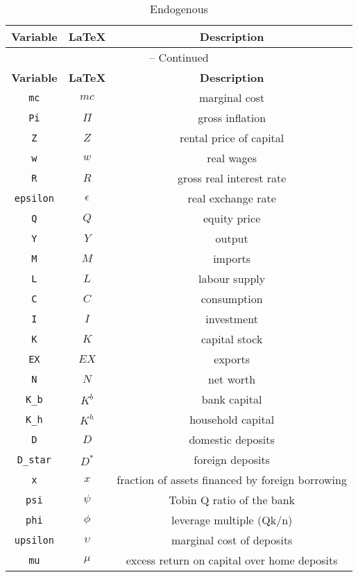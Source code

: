 \begin{center}
\begin{longtable}{ccc}
\caption{Endogenous}\\%
\hline%
\multicolumn{1}{c}{\textbf{Variable}} &
\multicolumn{1}{c}{\textbf{\LaTeX}} &
\multicolumn{1}{c}{\textbf{Description}}\\%
\hline\hline%
\endfirsthead
\multicolumn{3}{c}{{\tablename} \thetable{} -- Continued}\\%
\hline%
\multicolumn{1}{c}{\textbf{Variable}} &
\multicolumn{1}{c}{\textbf{\LaTeX}} &
\multicolumn{1}{c}{\textbf{Description}}\\%
\hline\hline%
\endhead
\texttt{mc} & $mc$ & marginal cost\\
\texttt{Pi} & $\Pi$ & gross inflation\\
\texttt{Z} & $Z$ & rental price of capital\\
\texttt{w} & $w$ & real wages\\
\texttt{R} & $R$ & gross real interest rate\\
\texttt{epsilon} & $\epsilon$ & real exchange rate\\
\texttt{Q} & $Q$ & equity price\\
\texttt{Y} & $Y$ & output\\
\texttt{M} & $M$ & imports\\
\texttt{L} & $L$ & labour supply\\
\texttt{C} & $C$ & consumption\\
\texttt{I} & $I$ & investment\\
\texttt{K} & $K$ & capital stock\\
\texttt{EX} & $EX$ & exports\\
\texttt{N} & $N$ & net worth\\
\texttt{K\_b} & $K^{b}$ & bank capital\\
\texttt{K\_h} & $K^{h}$ & household capital\\
\texttt{D} & $D$ & domestic deposits\\
\texttt{D\_star} & $D^{*}$ & foreign deposits\\
\texttt{x} & $x$ & fraction of assets financed by foreign borrowing\\
\texttt{psi} & $\psi$ & Tobin Q ratio of the bank\\
\texttt{phi} & $\phi$ & leverage multiple (Qk/n)\\
\texttt{upsilon} & $\upsilon$ & marginal cost of deposits\\
\texttt{mu} & $\mu$ & excess return on capital over home deposits\\

\end{longtable}
\end{center}
